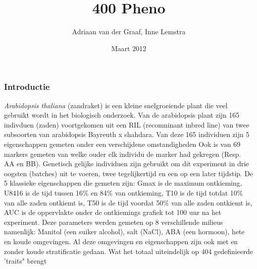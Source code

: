\documentclass[12pt,a4paper, twocolumn]{article}
\author{Adriaan van der Graaf, Inne Lemstra}
\title{400 Pheno}
\date{Maart 2012}
\begin{document}
\maketitle



\subsubsection*{Introductie}
\textit{Arabidopsis thaliana} (zandraket) is een kleine snelgroeiende plant die veel gebruikt wordt in het biologisch onderzoek.
Van de arabidopsis plant zijn 165 indivduen (zaden) voortgekomen uit een RIL (recomninant inbred line) van twee subsoorten van arabidopsis Bayreuth x shahdara.
Van deze 165 individuen zijn 5 eigenschappen gemeten onder een verschijdene omstandigheden
Ook is van 69 markers  gemeten van welke ouder elk individu de marker had gekregen (Resp. AA en BB).
Genetisch gelijke individuen zijn gebruikt om dit experiment in drie oogsten (batches) uit te voeren, twee tegelijkertijd en een op een later tijdstip.
De 5 klassieke eigenschappen die gemeten zijn:
Gmax is de maximum ontkieming,
U8416 is de tijd tussen 16\% en 84\% van  ontkieming,
T10 is de tijd totdat 10\% van alle zaden ontkiemt is,
T50 is de tijd voordat 50\% van alle zaden ontkiemt is,
AUC is de oppervlakte onder de ontkiemings grafiek  tot 100 uur na het experiment.
Deze parameters werden gemeten op 8 verschillende milieus namenlijk:
Manitol (een suiker alcohol), salt (NaCl), ABA (een hormoon), hete en koude omgevingen.
Al deze omgevingen en eigenschappen zijn ook met en zonder koude stratificatie gedaan. 
Wat het totaal uiteindelijk op 404 gedefinieerde 'traits" brengt\\
\end{document}

